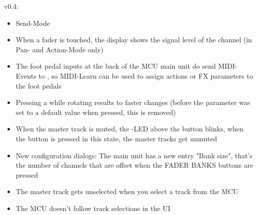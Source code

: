 \noindent
v0.4:
\begin{itemize}
\item Send-Mode 
\item When a fader is touched, the display shows the signal level of the channel (in Pan- and Action-Mode 
only)
\item The foot pedal inputs at the back of the MCU main unit do send MIDI-Events to \reaper, so MIDI-Learn can 
be used to assign actions or FX parameters to the foot pedals
\item Pressing a \vpot while rotating results to faster changes (before the parameter was set to a default 
value when pressed, this is removed)
\item When the master track is muted, the \solo-LED above the \recORD button blinks, when the \solo button is 
pressed in this state, the master tracks get unmuted
\item New configuration dialogs: The main unit has a new entry "Bank size", that's the number of channels 
that are offset when the FADER BANKS buttons are pressed
\item The master track gets unselected when you select a track from the MCU
\item The MCU doesn't follow track selections in the \reaper UI 
\end{itemize}

